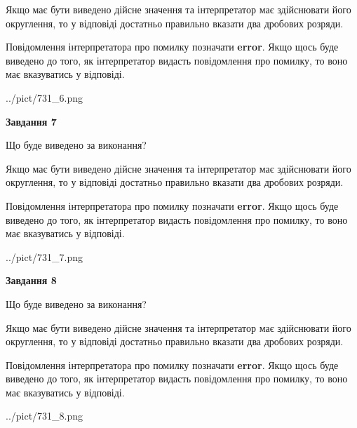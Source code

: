 \documentclass[12pt, ukrainian]{article}
\begin{document}
{\begin {Large}
Якщо має бути виведено дійсне значення та інтерпретатор має здійснювати його округлення, 
то у відповіді достатньо правильно вказати два дробових розряди.

Повідомлення інтерпретатора про помилку позначати \textbf{error}.
Якщо щось буде виведено до того, як інтерпретатор видасть повідомлення про помилку, 
то воно має вказуватись у відповіді. \par

\begin{center}
	{../pict/731_6.png}
\end{center}
\newpage

{\begin {center}\textbf{Завдання 7}\end {center}}\par
Що буде виведено за виконання? \par

Якщо має бути виведено дійсне значення та інтерпретатор має здійснювати його округлення, 
то у відповіді достатньо правильно вказати два дробових розряди.

Повідомлення інтерпретатора про помилку позначати \textbf{error}.
Якщо щось буде виведено до того, як інтерпретатор видасть повідомлення про помилку, 
то воно має вказуватись у відповіді. \par

\begin{center}
	{../pict/731_7.png}
\end{center}
\newpage

{\begin {center}\textbf{Завдання 8}\end {center}}\par
Що буде виведено за виконання? \par

Якщо має бути виведено дійсне значення та інтерпретатор має здійснювати його округлення, 
то у відповіді достатньо правильно вказати два дробових розряди.

Повідомлення інтерпретатора про помилку позначати \textbf{error}.
Якщо щось буде виведено до того, як інтерпретатор видасть повідомлення про помилку, 
то воно має вказуватись у відповіді. \par

\begin{center}
	{../pict/731_8.png}
\end{center}
\newpage


\end{Large}}
\end{document}

